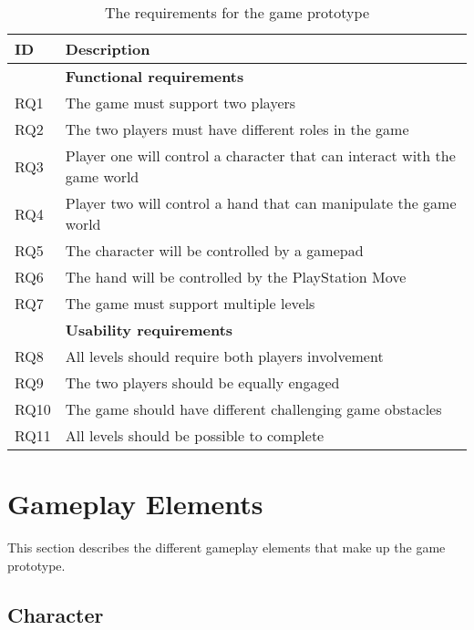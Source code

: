 \begin{table}[!ht]
	\centering
	\caption{The requirements for the game prototype}
	\label{tab:requirements}
	\begin{tabular}{|l|l|}
		\hline
		\textbf{ID} & \textbf{Description}                                  \\ \hline
					& \textbf{Functional requirements}                      \\ \hline
		RQ1         & The game must support two players                     \\
		RQ2         & The two players must have different roles in the game \\
		RQ3         & Player one will control a character that can interact with the game world \\
		RQ4         & Player two will control a hand that can manipulate the game world \\
		RQ5         & The character will be controlled by a gamepad         \\				RQ6         & The hand will be controlled by the PlayStation Move   \\
		RQ7         & The game must support multiple levels                 \\ \hline
					& \textbf{Usability requirements}                       \\ \hline
		RQ8         & All levels should require both players involvement    \\
		RQ9         & The two players should be equally engaged             \\
		RQ10        & The game should have different challenging game obstacles \\
		RQ11        & All levels should be possible to complete             \\ \hline
	\end{tabular}
\end{table}

\section{Gameplay Elements}
\label{sec:gameplay_elements}
This section describes the different gameplay elements that make up the game prototype.

\subsection{Character}


